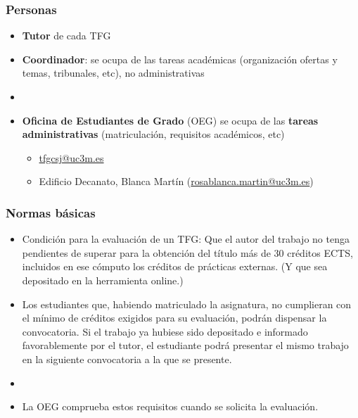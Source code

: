 \documentclass[aspectratio=43]{beamer}
\begin{document}
\begin{frame}
\frametitle{Personas}
\centering

\begin{itemize}
  \item \textbf{Tutor} de cada TFG
  \item \textbf{Coordinador}: se ocupa de las tareas académicas (organización ofertas y temas, tribunales, etc), no administrativas
  \item[]
  \item \textbf{Oficina de Estudiantes de Grado} (OEG) se ocupa de las \textbf{tareas administrativas} (matriculación, requisitos académicos, etc)
  \begin{itemize}
    \item \href{tfgcsj@uc3m.es}{tfgcsj@uc3m.es}
    \item Edificio Decanato, Blanca Martín {\footnotesize (\url{rosablanca.martin@uc3m.es})}
  \end{itemize}
\end{itemize}

\end{frame}


\begin{frame}
\frametitle{Normas básicas}
\centering


\begin{itemize}
  \item Condición para la evaluación de un TFG: Que el autor del trabajo no tenga pendientes de superar para la obtención del título más de 30 créditos ECTS, incluidos en ese cómputo los créditos de prácticas externas. (Y que sea depositado en la herramienta online.)
  \item Los estudiantes que, habiendo matriculado la asignatura, no cumplieran con el mínimo de créditos exigidos para su evaluación, podrán dispensar la convocatoria. Si el trabajo ya hubiese sido depositado e informado favorablemente por el tutor, el estudiante podrá presentar el mismo trabajo en la siguiente convocatoria a la que se presente.
  \item[]
  \item La OEG comprueba estos requisitos cuando se solicita la evaluación.
\end{itemize}


\end{frame}
\end{document}
